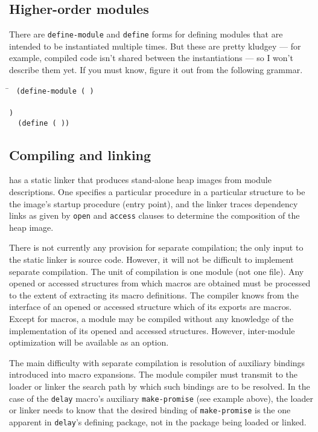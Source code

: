 \subsection*{Higher-order modules}

There are {\tt define-module} and {\tt define} forms for
defining modules that are intended to be instantiated multiple times.
But these are pretty kludgey --- for example, compiled code isn't
shared between the instantiations --- so I won't describe them yet.
If you must know, figure it out from the following grammar.
\begin{tabbing}
\qquad
    \=\goesto{}~
      \tt(d\=\tt{}efine-module ( ) \\
       \>  \> \\
       \>  \>\tt) \\
	\>\altz{}~ \tt(define 
		        ( ))
\end{tabbing}


\subsection*{Compiling and linking}

\hack{} has a static linker that produces stand-alone heap images
from module descriptions.  One specifies a particular procedure in a
particular structure to be the image's startup procedure (entry
point), and the linker traces dependency links as given by {\tt open}
and {\tt access} clauses to determine the composition of the heap
image.

There is not currently any provision for separate compilation; the
only input to the static linker is source code.  However, it will not
be difficult to implement separate compilation.  The unit of
compilation is one module (not one file).  Any opened or accessed
structures from which macros are obtained must be processed to the
extent of extracting its macro definitions.  The compiler knows from
the interface of an opened or accessed structure which of its exports
are macros.  Except for macros, a module may be compiled without any
knowledge of the implementation of its opened and accessed structures.
However, inter-module optimization will be available as an option.

The main difficulty with separate compilation is resolution of
auxiliary bindings introduced into macro expansions.  The module
compiler must transmit to the loader or linker the search path by
which such bindings are to be resolved.  In the case of the {\tt delay}
macro's auxiliary {\tt make-promise} (see example above), the loader
or linker needs to know that the desired binding of {\tt make-promise}
is the one apparent in {\tt delay}'s defining package, not in the
package being loaded or linked.

